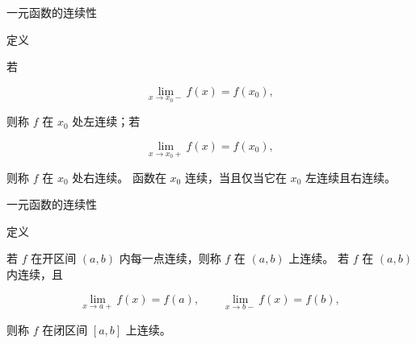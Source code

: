 \documentclass[aspectratio=169,10pt,fontset=fandol]{ctexbeamer}
\begin{document}
\begin{frame}[t,fragile]{一元函数的连续性}
\normalsize
\begin{block}{定义}
{\normalsize


若

\[

\lim_{x\to x_0-}f(x)=f(x_0),

\]

则称 $f$ 在 $x_0$ 处左连续；若

\[

\lim_{x\to x_0+}f(x)=f(x_0),

\]

则称 $f$ 在 $x_0$ 处右连续。 函数在 $x_0$ 连续，当且仅当它在 $x_0$ 左连续且右连续。


}
\end{block}
\end{frame}
\begin{frame}[t,fragile]{一元函数的连续性}
\normalsize
\begin{block}{定义}
{\normalsize


若 $f$ 在开区间 $(a,b)$ 内每一点连续，则称 $f$ 在 $(a,b)$ 上连续。 若 $f$ 在 $(a,b)$ 内连续，且

\[

\lim_{x\to a+}f(x)=f(a),\qquad \lim_{x\to b-}f(x)=f(b),

\]

则称 $f$ 在闭区间 $[a,b]$ 上连续。


}
\end{block}
\end{frame}
\end{document}
